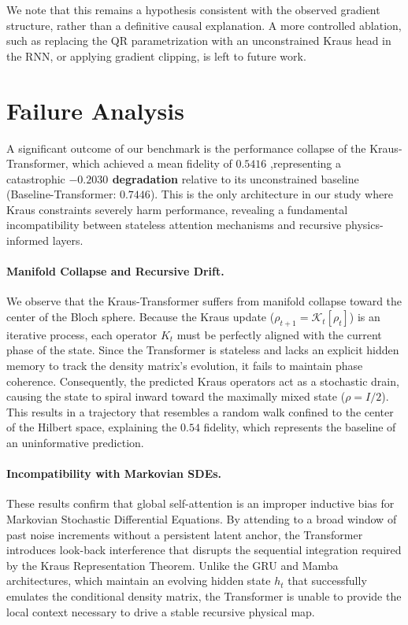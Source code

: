 \documentclass{article} %
\begin{document}
We note that this remains a hypothesis consistent with the observed 
gradient structure, rather than a definitive causal explanation. A more 
controlled ablation, such as replacing the QR parametrization with an 
unconstrained Kraus head in the RNN, or applying gradient clipping, is left to future work.
\section{Failure Analysis}
\label{app:failure_analysis}

A significant outcome of our benchmark is the performance collapse of the Kraus-Transformer, which achieved a mean fidelity of $0.5416$ ,representing a catastrophic \textbf{$-0.2030$ degradation} relative to its unconstrained baseline (Baseline-Transformer: $0.7446$). This is the only architecture in our study where Kraus constraints severely harm performance, revealing a fundamental incompatibility between stateless attention mechanisms and recursive physics-informed layers.

\paragraph{Manifold Collapse and Recursive Drift.}
We observe that the Kraus-Transformer suffers from manifold collapse toward the center of the Bloch sphere. Because the Kraus update ($\rho_{t+1} = \mathcal{K}_t[\rho_t]$) is an iterative process, each operator $K_t$ must be perfectly aligned with the current phase of the state. Since the Transformer is stateless and lacks an explicit hidden memory to track the density matrix's evolution, it fails to maintain phase coherence. Consequently, the predicted Kraus operators act as a stochastic drain, causing the state to spiral inward toward the maximally mixed state ($\rho = I/2$). This results in a trajectory that resembles a random walk confined to the center of the Hilbert space, explaining the $0.54$ fidelity, which represents the baseline of an uninformative prediction.

\paragraph{Incompatibility with Markovian SDEs.}
These results confirm that global self-attention is an improper inductive bias for Markovian Stochastic Differential Equations. By attending to a broad window of past noise increments without a persistent latent anchor, the Transformer introduces look-back interference that disrupts the sequential integration required by the Kraus Representation Theorem. Unlike the GRU and Mamba architectures, which maintain an evolving hidden state $h_t$ that successfully emulates the conditional density matrix, the Transformer is unable to provide the local context necessary to drive a stable recursive physical map.
\end{document}
